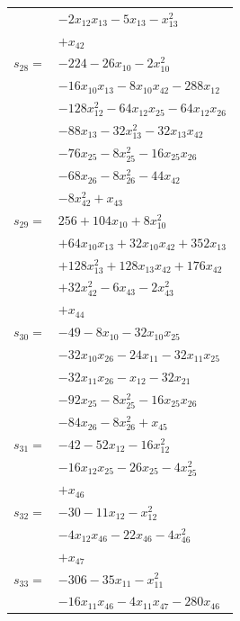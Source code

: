 \begin{longtable}{@{}r@{\;}l@{}}
 & \(\displaystyle -2x_{12}x_{13} -5x_{13} -x_{13}^{2}\) \\
 & \(\displaystyle +x_{42}\) \\[3pt]
\(s_{28}=\) & \(\displaystyle -224 -26x_{10} -2x_{10}^{2}\) \\
 & \(\displaystyle -16x_{10}x_{13} -8x_{10}x_{42} -288x_{12}\) \\
 & \(\displaystyle -128x_{12}^{2} -64x_{12}x_{25} -64x_{12}x_{26}\) \\
 & \(\displaystyle -88x_{13} -32x_{13}^{2} -32x_{13}x_{42}\) \\
 & \(\displaystyle -76x_{25} -8x_{25}^{2} -16x_{25}x_{26}\) \\
 & \(\displaystyle -68x_{26} -8x_{26}^{2} -44x_{42}\) \\
 & \(\displaystyle -8x_{42}^{2} +x_{43}\) \\[3pt]
\(s_{29}=\) & \(\displaystyle 256 +104x_{10} +8x_{10}^{2}\) \\
 & \(\displaystyle +64x_{10}x_{13} +32x_{10}x_{42} +352x_{13}\) \\
 & \(\displaystyle +128x_{13}^{2} +128x_{13}x_{42} +176x_{42}\) \\
 & \(\displaystyle +32x_{42}^{2} -6x_{43} -2x_{43}^{2}\) \\
 & \(\displaystyle +x_{44}\) \\[3pt]
\(s_{30}=\) & \(\displaystyle -49 -8x_{10} -32x_{10}x_{25}\) \\
 & \(\displaystyle -32x_{10}x_{26} -24x_{11} -32x_{11}x_{25}\) \\
 & \(\displaystyle -32x_{11}x_{26} -x_{12} -32x_{21}\) \\
 & \(\displaystyle -92x_{25} -8x_{25}^{2} -16x_{25}x_{26}\) \\
 & \(\displaystyle -84x_{26} -8x_{26}^{2} +x_{45}\) \\[3pt]
\(s_{31}=\) & \(\displaystyle -42 -52x_{12} -16x_{12}^{2}\) \\
 & \(\displaystyle -16x_{12}x_{25} -26x_{25} -4x_{25}^{2}\) \\
 & \(\displaystyle +x_{46}\) \\[3pt]
\(s_{32}=\) & \(\displaystyle -30 -11x_{12} -x_{12}^{2}\) \\
 & \(\displaystyle -4x_{12}x_{46} -22x_{46} -4x_{46}^{2}\) \\
 & \(\displaystyle +x_{47}\) \\[3pt]
\(s_{33}=\) & \(\displaystyle -306 -35x_{11} -x_{11}^{2}\) \\
 & \(\displaystyle -16x_{11}x_{46} -4x_{11}x_{47} -280x_{46}\) \\

\end{longtable}
